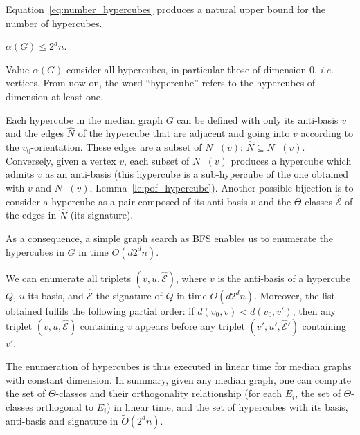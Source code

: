 \documentclass[a4paper,UKenglish,numberwithinsect,cleveref, autoref]{lipics-v2021}
\begin{document}
Equation~\eqref{eq:number_hypercubes} produces a natural upper bound for the number of hypercubes.

\begin{lemma}
$\alpha(G)\le 2^dn$.
\label{le:number_hypercubes}
\end{lemma}

Value $\alpha(G)$ consider all hypercubes, in particular those of dimension 0, {\em i.e.} vertices. From now on, the word ``hypercube'' refers to the hypercubes of dimension at least one.

Each hypercube in the median graph $G$ can be defined with only its anti-basis $v$ and the edges $\widehat{N}$ of the hypercube that are adjacent and going into $v$ according to the $v_0$-orientation. These edges are a subset of $N^-(v)$: $\widehat{N} \subseteq N^-(v)$. Conversely, given a vertex $v$, each subset of $N^-(v)$ produces a hypercube which admits $v$ as an anti-basis (this hypercube is a sub-hypercube of the one obtained with $v$ and $N^-(v)$, Lemma~\ref{le:pof_hypercube}). Another possible bijection is to consider a hypercube as a pair composed of its anti-basis $v$ and the $\Theta$-classes $\widehat{\mathcal{E}}$ of the edges in $\widehat{N}$ (its signature).

As a consequence, a simple graph search as BFS enables us to enumerate the hypercubes in $G$ in time $O(d2^dn)$.

\begin{lemma}
We can enumerate all triplets $(v,u,\widehat{\mathcal{E}})$, where $v$ is the anti-basis of a hypercube $Q$, $u$ its basis, and $\widehat{\mathcal{E}}$ the signature of $Q$ in time $O(d2^dn)$. Moreover, the list obtained fulfils the following partial order: if $d(v_0,v) < d(v_0,v')$, then any triplet $(v,u,\widehat{\mathcal{E}})$ containing $v$ appears before any triplet $(v',u',\widehat{\mathcal{E}}')$ containing $v'$.
\label{le:enum_hypercubes}
\end{lemma}

The enumeration of hypercubes is thus executed in linear time for median graphs with constant dimension. In summary, given any median graph, one can compute the set of $\Theta$-classes and their orthogonality relationship (for each $E_i$, the set of $\Theta$-classes orthogonal to $E_i$) in linear time, and the set of hypercubes with its basis, anti-basis and signature in $\tilde{O}(2^dn)$.
\end{document}
